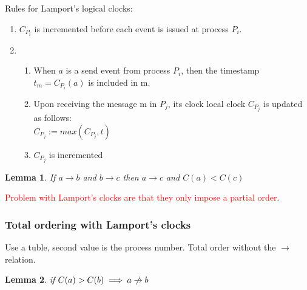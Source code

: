 \documentclass[a4paper]{article}
\newtheorem{lemma}{Lemma}
\begin{document}
Rules for Lamport's logical clocks:
\begin{enumerate}
	\item $C_{P_i}$ is incremented before each event is issued at process
		$P_i$.
	\item \begin{enumerate}
			\item When $a$ is a send event from process $P_i$, then
				the timestamp \\$t_m=C_{P_i}(a)$ is included in m.
			\item Upon receiving the message m in $P_j$, its clock
				local clock $C_{P_j}$ is updated as follows:\\
				$C_{P_j} := max(C_{P_j},t)$
			\item $C_{P_j}$ is incremented
		\end{enumerate}
\end{enumerate}
\begin{lemma}
	If $a\rightarrow b$ and $b\rightarrow c$ then $a\rightarrow c$ and
	$C(a)<C(c)$
\end{lemma}
\textcolor{red}{Problem with Lamport's clocks are that they only impose a
partial order.}
\subsubsection{Total ordering with Lamport's clocks}
Use a tuble, second value is the process number. Total order without the
$\rightarrow$ relation.

\begin{lemma}
	if $C(a) > C(b) \implies a \centernot \rightarrow b$
\end{lemma}
\end{document}

